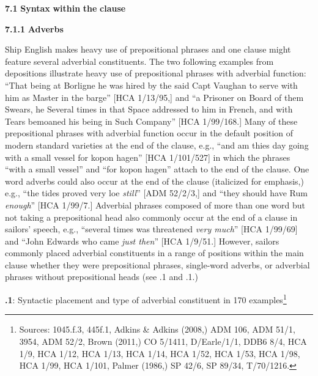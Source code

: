 \textbf{7.1} \textbf{Syntax} \textbf{within} \textbf{the} \textbf{clause}

  \textbf{7.1.1} \textbf{Adverbs}

  Ship English makes heavy use of prepositional phrases and one clause might feature several adverbial constituents. The two following examples from depositions illustrate heavy use of prepositional phrases with adverbial function: “That being at Borligne he was hired by the said Capt Vaughan to serve with him as Master in the barge” [HCA 1/13/95,] and “a Prisoner on Board of them Swears, he Several times in that Space addressed to him in French, and with Tears bemoaned his being in Such Company” [HCA 1/99/168.] Many of these prepositional phrases with adverbial function occur in the default position of modern standard varieties at the end of the clause, e.g., “and am thies day going with a small vessel for kopon hagen” [HCA 1/101/527] in which the phrases “with a small vessel” and “for kopon hagen” attach to the end of the clause. One word adverbs could also occur at the end of the clause (italicized for emphasis,) e.g., “the tides proved very loe \textit{still}” [ADM 52/2/3,] and “they should have Rum \textit{enough}” [HCA 1/99/7.] Adverbial phrases composed of more than one word but not taking a prepositional head also commonly occur at the end of a clause in sailors’ speech, e.g., “several times was threatened \textit{very much}” [HCA 1/99/69] and “John Edwards who came \textit{just then}” [HCA 1/9/51.] However, sailors commonly placed adverbial constituents in a range of positions within the main clause whether they were prepositional phrases, single-word adverbs, or adverbial phrases without prepositional heads (see .1 and .1.) 

  
 

\textbf{.1}: Syntactic placement and type of adverbial constituent in 170 examples\footnote{Sources: 1045.f.3, 445f.1, Adkins \& Adkins (2008,) ADM 106, ADM 51/1, 3954, ADM 52/2, Brown (2011,) CO 5/1411, D/Earle/1/1, DDB6 8/4, HCA 1/9, HCA 1/12, HCA 1/13, HCA 1/14, HCA 1/52, HCA 1/53, HCA 1/98, HCA 1/99, HCA 1/101, Palmer (1986,) SP 42/6, SP 89/34, T/70/1216.}

  
 

